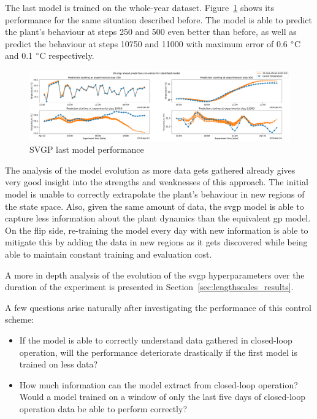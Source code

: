 The last model is trained on the whole-year dataset.
Figure~\ref{fig:SVGP_last_model_performance} shows its performance for the same
situation described before. The model is able to predict the plant's behaviour
at steps 250 and 500 even better than before, as well as predict the behaviour
at steps 10750 and 11000 with maximum error of 0.6 $\degree$C and 0.1 $\degree$C
respectively.

\begin{figure}[ht]
    \centering
    \includegraphics[width =
    \textwidth]{Plots/1_SVGP_480pts_inf_window_12_averageYear_last_model_performance.pdf}
    \caption{SVGP last model performance}
    \label{fig:SVGP_last_model_performance}
\end{figure}

The analysis of the model evolution as more data gets gathered already gives
very good insight into the strengths and weaknesses of this approach. The
initial model is unable to correctly extrapolate the plant's behaviour in new
regions of the state space. Also, given the same amount of data, the
\acrshort{svgp} model is able to capture less information about the plant
dynamics than the equivalent \acrshort{gp} model. On the flip side, re-training
the model every day with new information is able to mitigate this by adding the
data in new regions as it gets discovered while being able to maintain constant
training and evaluation cost.

A more in depth analysis of the evolution of the \acrshort{svgp} hyperparameters
over the duration of the experiment is presented in
Section~\ref{sec:lengthscales_results}.

A few questions arise naturally after investigating the performance of this
control scheme: 

\begin{itemize}
    \item If the model is able to correctly understand data gathered in
        closed-loop operation, will the performance deteriorate drastically if
        the first model is trained on less data?
    \item How much information can the model extract from closed-loop operation?
        Would a model trained on a window of only the last five days of 
        closed-loop operation data be able to perform correctly?
\end{itemize}

